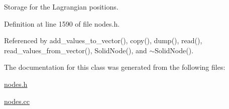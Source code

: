 Storage for the Lagrangian positions. 



Definition at line 1590 of file nodes.\+h.



Referenced by add\+\_\+values\+\_\+to\+\_\+vector(), copy(), dump(), read(), read\+\_\+values\+\_\+from\+\_\+vector(), Solid\+Node(), and $\sim$\+Solid\+Node().



The documentation for this class was generated from the following files\+:\begin{DoxyCompactItemize}
\item 
\hyperlink{nodes_8h}{nodes.\+h}\item 
\hyperlink{nodes_8cc}{nodes.\+cc}\end{DoxyCompactItemize}

